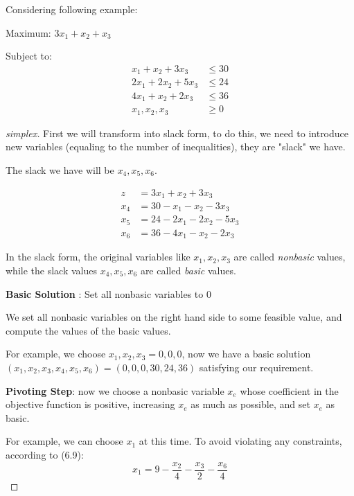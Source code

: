 \begin{example}
    Considering following example:

    Maximum: \(3x_1 + x_2 + x_3\) 

    Subject to:
    \begin{align*}
        x_1 + x_2 + 3x_3 &\leq 30 \\
        2x_1 + 2x_2 + 5x_3 &\leq 24 \\
        4x_1 + x_2 + 2x_3 &\leq 36 \\
        x_1, x_2, x_3 &\geq 0
    \end{align*}
\end{example}
\begin{proof}[simplex]
    First we will transform into slack form, to do this, we need to introduce new variables (equaling to the number of inequalities), they are "slack" we have.

    The slack we have will be \(x_4, x_5, x_6\). 

    \begin{align}
        z &= 3x_1 + x_2 + 3x_3 \\
        x_4 &= 30 - x_1 - x_2 - 3x_3 \\
        x_5 &= 24 -2x_1 - 2x_2 - 5x_3 \\
        x_6 &= 36 - 4x_1 - x_2 - 2x_3
    \end{align}

    In the slack form, the original variables like \(x_1, x_2, x_3\) are called \textit{nonbasic} values, while the slack values \(x_4, x_5, x_6\) are called \textit{basic} values.  

    \textbf{Basic Solution} : Set all nonbasic variables to 0 

    We set all nonbasic variables on the right hand side to some feasible value, and compute the values of the basic values. 
    
    For example, we choose \(x_1, x_2, x_3 = 0, 0, 0\), now we have a basic solution \((x_1, x_2, x_3, x_4, x_5, x_6) = (0, 0, 0, 30, 24, 36)\) satisfying our requirement.  

    \textbf{Pivoting Step}: now we choose a nonbasic variable \(x_e\) whose coefficient in the objective function is positive, 
    increasing \(x_e\) as much as possible, and set \(x_e\) as basic.    

    For example, we can choose \(x_1\) at this time.
    To avoid violating any constraints, according to (6.9):
    \[
        x_1 = 9 - \dfrac{x_2}{4} - \dfrac{x_3}{2} - \dfrac{x_6}{4} 
    \] 


\end{proof}
